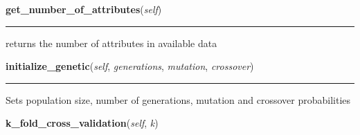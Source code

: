     \vspace{0.5ex}

\hspace{.8\funcindent}\begin{boxedminipage}{\funcwidth}

    \raggedright \textbf{get\_number\_of\_attributes}(\textit{self})

    \vspace{-1.5ex}

    \rule{\textwidth}{0.5\fboxrule}
\setlength{\parskip}{2ex}
    returns the number of attributes in available data

\setlength{\parskip}{1ex}
    \end{boxedminipage}

    \label{genetic_fuzzy_logic_classifier:GeneticFuzzyLogicClassifier:initialize_genetic}

    \vspace{0.5ex}

\hspace{.8\funcindent}\begin{boxedminipage}{\funcwidth}

    \raggedright \textbf{initialize\_genetic}(\textit{self}, \textit{generations}, \textit{mutation}, \textit{crossover})

    \vspace{-1.5ex}

    \rule{\textwidth}{0.5\fboxrule}
\setlength{\parskip}{2ex}
    Sets population size, number of generations, mutation and crossover 
    probabilities

\setlength{\parskip}{1ex}
    \end{boxedminipage}

    \label{genetic_fuzzy_logic_classifier:GeneticFuzzyLogicClassifier:k_fold_cross_validation}

    \vspace{0.5ex}

\hspace{.8\funcindent}\begin{boxedminipage}{\funcwidth}

    \raggedright \textbf{k\_fold\_cross\_validation}(\textit{self}, \textit{k})

\setlength{\parskip}{2ex}
\setlength{\parskip}{1ex}
    \end{boxedminipage}

